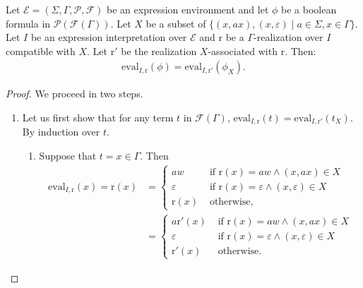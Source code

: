\documentclass[a4paper]{llncs}
\begin{document}
    \begin{lemma}\label{lem r assoc egal r pour phi}
    Let $\mathcal{E}=(\Sigma,\Gamma,\mathcal{P},\mathcal{F})$ be an expression environment and let $\phi$ be a boolean formula in $\mathcal{P}(\mathcal{F}(\Gamma))$. Let $X$ be a subset of $\{(x,ax),(x,\varepsilon)\mid a\in\Sigma,x\in\Gamma\}$. Let $I$ be an expression interpretation over $\mathcal{E}$ and $\mathrm{r}$ be a $\Gamma$-realization over $I$ compatible with $X$. Let $\mathrm{r}'$ be the realization $X$-associated with $\mathrm{r}$. Then:
    \begin{align*}
      \mathrm{eval}_{I,\mathrm{r}}(\phi)=\mathrm{eval}_{I,\mathrm{r}'}(\phi_X).
    \end{align*}
  \end{lemma}
  \begin{proof}
    We proceed in two steps.
    \begin{enumerate}
    \item\label{p1} Let us first show that for any term $t$ in $\mathcal{F}(\Gamma)$, $\mathrm{eval}_{I,\mathrm{r}}(t)=\mathrm{eval}_{I,\mathrm{r}'}(t_X)$.
    By induction over $t$.
    \begin{enumerate}
      \item Suppose that $t=x\in\Gamma$.
        Then 
        \begin{align*}
          \mathrm{eval}_{I,\mathrm{r}}(x)=\mathrm{r}(x) & =
            \begin{cases}
                  aw & \text{ if }\mathrm{r}(x)=aw \wedge (x,ax)\in X\\
                  \varepsilon & \text{ if }\mathrm{r}(x)=\varepsilon \wedge (x,\varepsilon)\in X\\
                  \mathrm{r}(x) & \text{ otherwise,}
            \end{cases}\\
            & =
              \begin{cases}
                  a\mathrm{r}'(x) & \text{ if }\mathrm{r}(x)=aw \wedge (x,ax)\in X\\
                  \varepsilon & \text{ if }\mathrm{r}(x)=\varepsilon \wedge (x,\varepsilon)\in X\\
                  \mathrm{r}'(x) & \text{ otherwise.}
              \end{cases}
        \end{align*}
        

\end{enumerate}
\end{enumerate}
\end{proof}
\end{document}
